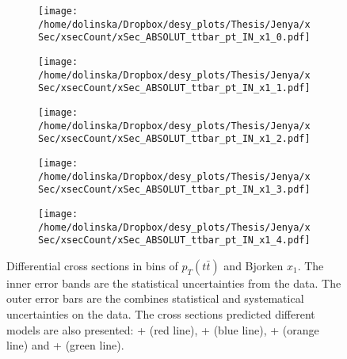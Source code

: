 \begin{sidewaysfigure}[p]
\centering
\begin{subfigure}
  \centering
  \texttt{[image: /home/dolinska/Dropbox/desy\_plots/Thesis/Jenya/xSec/xsecCount/xSec\_ABSOLUT\_ttbar\_pt\_IN\_x1\_0.pdf]}
\end{subfigure}
\begin{subfigure}
  \centering
  \texttt{[image: /home/dolinska/Dropbox/desy\_plots/Thesis/Jenya/xSec/xsecCount/xSec\_ABSOLUT\_ttbar\_pt\_IN\_x1\_1.pdf]}
\end{subfigure}
\begin{subfigure}
  \centering
  \texttt{[image: /home/dolinska/Dropbox/desy\_plots/Thesis/Jenya/xSec/xsecCount/xSec\_ABSOLUT\_ttbar\_pt\_IN\_x1\_2.pdf]}
\end{subfigure}
\begin{subfigure}
  \centering
  \texttt{[image: /home/dolinska/Dropbox/desy\_plots/Thesis/Jenya/xSec/xsecCount/xSec\_ABSOLUT\_ttbar\_pt\_IN\_x1\_3.pdf]}
\end{subfigure}
\begin{subfigure}
  \centering
  \texttt{[image: /home/dolinska/Dropbox/desy\_plots/Thesis/Jenya/xSec/xsecCount/xSec\_ABSOLUT\_ttbar\_pt\_IN\_x1\_4.pdf]}
\end{subfigure}
\caption{Differential cross sections in bins of $p_{T}(t\bar{t})$ and Bjorken $x_{1}$. The inner error bands are the statistical uncertainties from the data.
         The outer error bars are the combines statistical and systematical uncertainties on the data. The cross sections predicted different models are also presented:
         \MG + \PYTHIA (red line), \Powheg + \PYTHIA (blue line), \Powheg + \HERWIG (orange line) and \MCNLO + \HERWIG (green line).}
\label{fig:XSU_2D_x1_pttt}
\end{sidewaysfigure}
